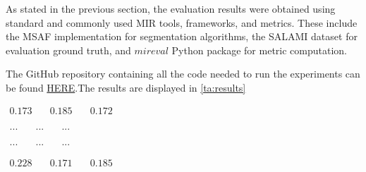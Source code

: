 
As stated in the previous section, the evaluation results were obtained using standard and commonly used MIR tools, frameworks, and metrics. These include the MSAF \cite{MSAF} implementation for segmentation algorithms, the SALAMI dataset \cite{Smith2011DESIGNANNOTATIONS} for evaluation ground truth, and $mireval$ Python package \cite{RaffelMir_eval:METRICS} for metric computation.

The GitHub repository containing all the code needed to run the experiments can be found \href{https://github.com/oriolcolomefont/Master-Thesis.git}{HERE}.The results are displayed in \ref{ta:results}


\newsavebox\mfccSF
\begin{lrbox}{\mfccSF}
\centering
   $\begin{aligned}
     0.173 & \quad 0.185 & \quad 0.172 %
    \end{aligned} $
\end{lrbox}

\newsavebox\mfccFoote
\begin{lrbox}{\mfccFoote}
\centering
   $\begin{aligned}
     ... & \quad ... & \quad ... %
    \end{aligned} $
\end{lrbox}

\newsavebox\mfccCNMF
\begin{lrbox}{\mfccCNMF}
\centering
   $\begin{aligned}
     ... & \quad ... & \quad ... %
    \end{aligned} $
\end{lrbox}

\newsavebox\embeddioaSF
\begin{lrbox}{\embeddioaSF}
   $\begin{aligned}
     0.228 & \quad 0.171 & \quad 0.185
    \end{aligned} $
\end{lrbox}

\newsavebox\embeddioaFoote
\begin{lrbox}{\embeddioaFoote}
   $\begin{aligned}
      & \quad  & \quad 
    \end{aligned} $
\end{lrbox}

\newsavebox\embeddioaCNMF
\begin{lrbox}{\embeddioaCNMF}
   $\begin{aligned}
      & \quad  & \quad 
    \end{aligned} $
\end{lrbox}

